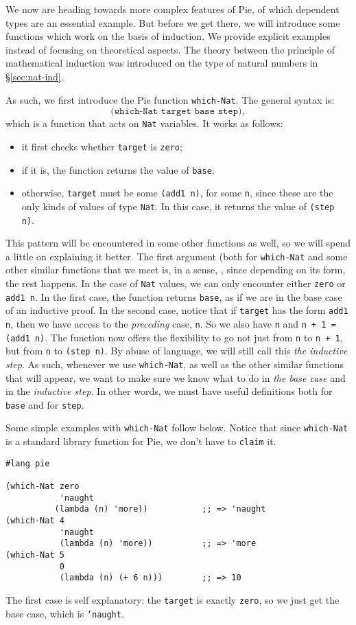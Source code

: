 We now are heading towards more complex features of Pie, of which
dependent types are an essential example. But before we get there,
we will introduce some functions which work on the basis of induction.
We provide explicit examples instead of focusing on theoretical aspects.
The theory between the principle of mathematical induction was
introduced on the type of natural numbers in \S\ref{sec:nat-ind}.

As such, we first introduce the Pie function \texttt{which-Nat}.
The general syntax is:
\[
  \texttt{(which-Nat target base step)},
\]
which is a function that acts on \texttt{Nat} variables.
It works as follows:
\begin{itemize}
\item it first checks whether \texttt{target} is \texttt{zero};
\item if it is, the function returns the value of \texttt{base};
\item otherwise, \texttt{target} must be some \texttt{(add1 n)},
  for some \texttt{n}, since these are the only kinds of values of type
  \texttt{Nat}. In this case, it returns the value of \texttt{(step n)}.
\end{itemize}

This pattern will be encountered in some other functions as well,
so we will spend a little on explaining it better. The first argument
(both for \texttt{which-Nat} and some other similar functions that we
meet is, in a sense, , since depending on its form,
the rest happens. In the case of \texttt{Nat} values, we can only encounter
either \texttt{zero} or \texttt{add1 n}. In the first case, the function
returns \texttt{base}, as if we are in the base case of an inductive proof.
In the second case, notice that if \texttt{target} has the form
\texttt{add1 n}, then we have access to the \emph{preceding} case, \texttt{n}.
So we also have \texttt{n} and \texttt{n + 1 = (add1 n)}. The function now
offers the flexibility to go not just from \texttt{n} to \texttt{n + 1},
but from \texttt{n} to \texttt{(step n)}. By abuse of language, we will still
call this \emph{the inductive step}. As such, whenever we use \texttt{which-Nat},
as well as the other similar functions that will appear, we want to make
sure we know what to do in \emph{the base case} and in the \emph{inductive step}.
In other words, we must have useful definitions both for \texttt{base}
and for \texttt{step}.

Some simple examples with \texttt{which-Nat} follow below. Notice that since
\texttt{which-Nat} is a standard library function for Pie, we don't have
to \texttt{claim} it.
{
  \small
\begin{verbatim}
#lang pie

(which-Nat zero
           'naught
          (lambda (n) 'more))           ;; => 'naught
(which-Nat 4
           'naught
           (lambda (n) 'more))          ;; => 'more
(which-Nat 5
           0
           (lambda (n) (+ 6 n)))        ;; => 10
\end{verbatim}
}
The first case is self explanatory: the \texttt{target} is exactly
\texttt{zero}, so we just get the base case, which is \texttt{'naught}.

